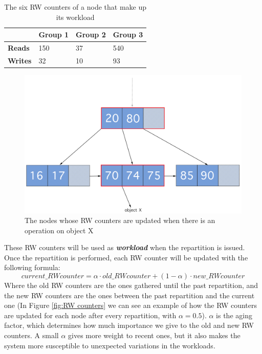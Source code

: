\begin{table}[!htb]
  \centering
  \begin{tabular}{l l l l}
    \hline
    & \textbf{Group 1} & \textbf{Group 2} & \textbf{Group 3} \\
    \hline
    \textbf{Reads} & 150 & 37 & 540 \\
    \textbf{Writes} & 32 & 10 & 93 \\
    \hline
  \end{tabular}
  \caption{The six RW counters of a node that make up its workload}\label{tab:workload-example}
\end{table}

\begin{figure}[!htb]
  \centering
  \includegraphics[width=\textwidth,height=\textheight,keepaspectratio]{img/B+tree_path.png}
  \caption{ The nodes whose RW counters are updated when there is an operation on object X }
  \label{fig:B+tree_path}
\end{figure}

These RW counters will be used as \textbf{\emph{workload}} when the repartition is issued. Once the repartition is performed, each RW counter will be updated with the following formula:
$$ current\_RW counter = \alpha \cdot old\_RW counter + (1-\alpha) \cdot new\_RW counter $$
Where the old RW counters are the ones gathered until the past repartition, and the new RW counters are the ones between the past repartition and the current one (In Figure \ref{fig:RW counters} we can see an example of how the RW counters are updated for each node after every repartition, with $\alpha = 0.5$).
$\alpha$ is the aging factor, which determines how much importance we give to the old and new RW counters. A small $\alpha$ gives more weight to recent ones, but it also makes the system more susceptible to unexpected variations in the workloads.

